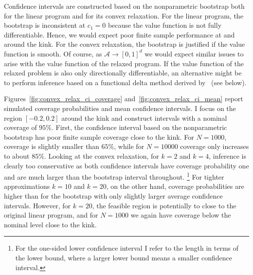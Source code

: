 \documentclass[12pt,a4paper,english]{article} %
\numberwithin{equation}{section}
\theoremstyle{definition}
\theoremstyle{remark}
\theoremstyle{plain}
\begin{document}
Confidence intervals are constructed based on the nonparametric bootstrap both for the linear program and for its convex relaxation.
For the linear program, the bootstrap is inconsistent at $c_1=0$ because the value function is not fully differentiable.
Hence, we would expect poor finite sample performance at and around the kink.
For the convex relaxation, the bootstrap is justified if the value function is smooth.
Of course, as $\mathcal{A}\to [0,1]^d$ we would expect similar issues to arise with the value function of the relaxed program.
If the value function of the relaxed problem is also only directionally differentiable, an alternative might be to perform inference based on a functional delta method derived by~\cite{shapiro1991asymptotic} (see below).

Figures~\ref{fig:convex_relax_ci_coverage} and~\ref{fig:convex_relax_ci_mean} report simulated coverage probabilities and mean confidence intervals.
I focus on the region $[-0.2, 0.2]$ around the kink and construct intervals with a nominal coverage of $95\%$.
First, the confidence interval based on the nonparametric bootstrap has poor finite sample coverage close to the kink. For $N=1000$, coverage is slightly smaller than $65$\%, while for $N=10000$ coverage only increases to about $85$\%.
Looking at the convex relaxation, for $k=2$ and $k=4$, inference is clearly too conservative as both confidence intervals have coverage probability one and are much larger than the bootstrap interval throughout.
\footnote{For the one-sided lower confidence interval I refer to the length in terms of the lower bound, where a larger lower bound means a smaller confidence interval.}
For tighter approximations $k=10$ and $k=20$, on the other hand, coverage probabilities are higher than for the bootstrap with only slightly larger average confidence intervals.
However, for $k=20$, the feasible region is potentially to close to the original linear program, and for $N=1000$ we again have coverage below the nominal level close to the kink.
\end{document}
